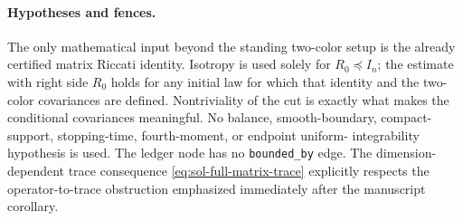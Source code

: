 \documentclass[../main.tex]{subfiles}
\begin{document}
\paragraph{Hypotheses and fences.}
The only mathematical input beyond the standing two-color setup is the already certified
matrix Riccati identity.  Isotropy is used solely for $R_0\preceq I_n$; the estimate with right
side $R_0$ holds for any initial law for which that identity and the two-color covariances are
defined.  Nontriviality of the cut is exactly what makes the conditional covariances meaningful.
No balance, smooth-boundary, compact-support, stopping-time, fourth-moment, or endpoint uniform-
integrability hypothesis is used.  The ledger node has no \texttt{bounded\_by} edge.  The
dimension-dependent trace consequence \eqref{eq:sol-full-matrix-trace} explicitly respects the
operator-to-trace obstruction emphasized immediately after the manuscript corollary.
\end{document}
